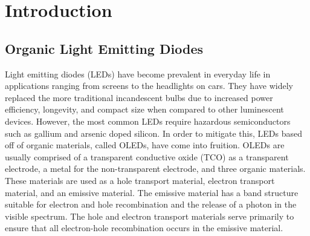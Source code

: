 \documentclass{report}
\begin{document}
\tableofcontents

\chapter{Introduction} \label{intro}

    \section{Organic Light Emitting Diodes}
        Light emitting diodes (LEDs) have become prevalent in everyday life in applications ranging from screens to the headlights on cars. They have widely replaced the more traditional incandescent bulbs due to increased power efficiency, longevity, and compact size when compared to other luminescent devices. However, the most common LEDs require hazardous semiconductors such as gallium and arsenic doped silicon. In order to mitigate this, LEDs based off of organic materials, called OLEDs, have come into fruition. OLEDs are usually comprised of a transparent conductive oxide (TCO) as a transparent electrode, a metal for the non-transparent electrode, and three organic materials. These materials are used as a hole transport material, electron transport material, and an emissive material. The emissive material has a band structure suitable for electron and hole recombination and the release of a photon in the visible spectrum. The hole and electron transport materials serve primarily to ensure that all electron-hole recombination occurs in the emissive material.
        
\end{document}
